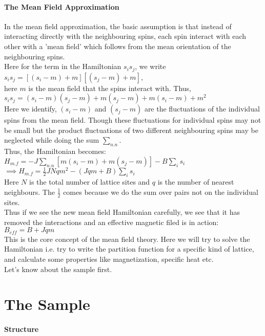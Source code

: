 \documentclass[20pt]{article}
\begin{document}
\paragraph{The Mean Field Approximation\\}
In the mean field approximation, the basic assumption is that instead of interacting directly with the neighbouring spins, each spin interact with each other with a 'mean field' which follows from the mean orientation of the neighbouring spins.\\

Here for the term in the Hamiltonian $s_i s_j$, we write\\

$s_i s_j = [(s_i - m)+m][(s_j - m)+ m]$,\\ 

here $m$ is the mean field that the spins interact with. Thus,\\


$s_i s_j  = (s_i - m)(s_j - m) + m(s_j - m) + m(s_i - m)+ m^2$ \\


Here we identify, $(s_i - m)$ and $(s_j - m)$ are the fluctuations of the individual spins from the mean field. Though these fluctuations for individual spins may not be small but the product fluctuations of two different neighbouring spins  may be neglected while doing the sum $\sum_{n.n}$.\\
Thus, the Hamiltonian becomes:\\

$H_{m.f} = -J \sum_{n.n} [m (s_i - m) + m (s_j - m)] - B \sum_{i} s_i$\\

$\implies H_{m.f} = \frac{1}{2} J N q m^2 - (J q m + B)\sum_{i} s_i $ \\

Here $N$ is the total number of lattice sites and $q$ is the number of nearest neighbours. The $\frac{1}{2}$ comes because we do the sum over pairs not on the individual sites.\\
Thus if we see the new mean field Hamiltonian carefully, we see that it has removed the interactions and an effective magnetic filed is in action:\\
$B_{eff} = B + J q m$\\

This is the core concept of the mean field theory. Here we will try to solve the Hamiltonian i.e. try to write the partition function for a specific kind of lattice, and calculate some properties like magnetization, specific heat etc.\\
Let's know about the sample first.\\

\section*{The Sample}
\paragraph{Structure\\}

 
\end{document}
